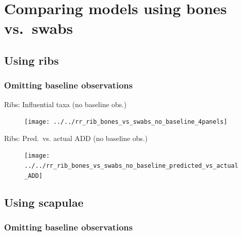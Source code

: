\documentclass{beamer}
\begin{document}



\section[Bones vs.\ swabs]{Comparing models using bones vs.\ swabs}

\subsection[Ribs]{Using ribs}


\subsubsection[No baseline]{Omitting baseline observations}

\begin{frame}{Ribs: Influential taxa (no baseline obs.)}

  \begin{center}
    \begin{figure}
      \texttt{[image: ../../rr\_rib\_bones\_vs\_swabs\_no\_baseline\_4panels]}
    \end{figure}
  \end{center}

\end{frame}


\begin{frame}{Ribs: Pred.\ vs. actual ADD (no baseline obs.)}

  \begin{center}
    \begin{figure}
      \texttt{[image: ../../rr\_rib\_bones\_vs\_swabs\_no\_baseline\_predicted\_vs\_actual\_ADD]}
    \end{figure}
  \end{center}

\end{frame}



\subsection[Scapulae]{Using scapulae}

\subsubsection[No baseline]{Omitting baseline observations}
\end{document}
